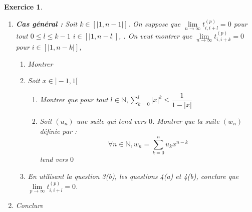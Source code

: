 \documentclass[a4paper,11pt]{article}
\newtheorem{exer}{Exercice} %
\begin{document}
\begin{exer}
\begin{enumerate}
\begin{enumerate}
$$ t_{i,i+1}^{(p+1)} = t_{i,i+1}^{(p)} t_{i,i} + t_{i+1,i+1}^{p} t_{i,i+1}$$
\item Soit $(u_n)_{n \geq 1}$ une suite récurrente définie par : $u_{n+1} = a u_n + b_n$ avec $a \in \mathbb{R}$ et $(b_n)$ une suite réelle. Montrer que $$u_n = u_1 a^{n-1} + \displaystyle\sum_{k=1}^{n-1}{b_k a^{n-1-k}}$$ pour $n \geq 1$
\item Trouver une expression simplifiée de $t_{i,i+1}^{(p)}$ en utilisant la formule précédente, puis montrer que cette suite tend vers $0$ \\
\end{enumerate}
\item \textbf{Cas général :}
Soit $k \in [|1,n-1|]$.
On suppose que  $\lim\limits_{n \to \infty} t_{i,i+l}^{(p)} = 0$ pour tout $0 \leq l \leq k-1$ $i \in [|1,n-l|]$, . On veut montrer que $\lim\limits_{n \to \infty} t_{i,i+k}^{(p)} = 0$ pour $i \in [|1,n-k|]$,
\begin{enumerate}
\item Montrer 
\item Soit $x \in ]-1,1[$
\begin{enumerate}
\item Montrer que pour tout $l \in \mathbb{N}, \displaystyle\sum_{k=0}^{l}{|x|^k} \leq \dfrac{1}{1-|x|}$
\item Soit $(u_n)$ une suite qui tend vers $0$. Montrer que la suite $(w_n)$ définie par :
$$ \forall n \in \mathbb{N}, w_n = \displaystyle\sum_{k=0}^{n}{u_k x^{n-k}}$$ tend vers $0$
\end{enumerate}
\item En utilisant la question 3(b), les questions 4(a) et 4(b), conclure que $\lim\limits_{p \to \infty} t_{i,i+l}^{(p)} = 0$.
\end{enumerate}
\item Conclure
\end{enumerate}
\end{exer}



	
\end{document}
